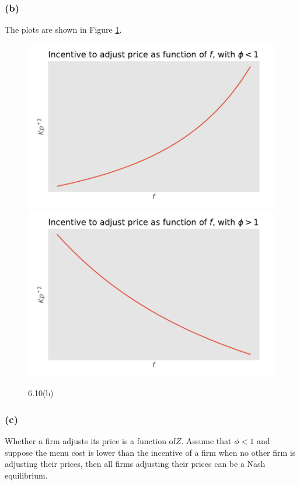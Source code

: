 \documentclass[12pt]{article}
\begin{document}
        \subsubsection*{(b)} The plots are shown in Figure \ref{misclabel}.
        \begin{figure}[htbp]
    \begin{center}
    \includegraphics[scale = 0.4]{phi_less_than_one}
    \includegraphics[scale = 0.4]{phi_greater_than_one}
    \caption{6.10(b)}
    \label{misclabel}
    \end{center}
    \end{figure}
    
        
        
        \subsubsection*{(c)} Whether a firm adjusts its price is a function of$Z$. 
        Assume that $\phi <1$ and suppose the menu cost is lower than the incentive of a firm when no other firm is adjusting their prices, then all firms adjusting their prices can be a Nash equilibrium. 
        
\end{document}
